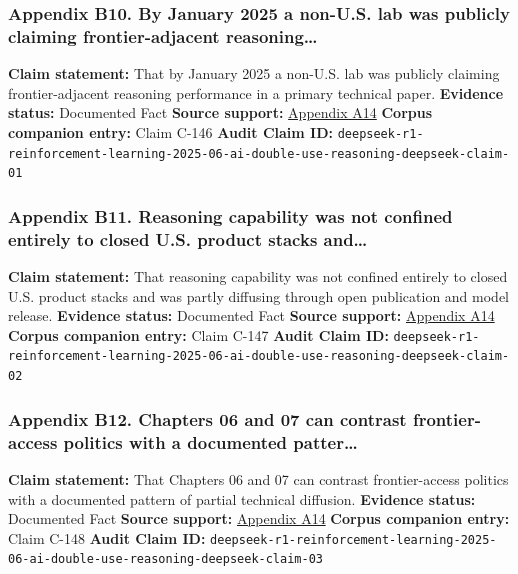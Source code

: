 \documentclass[
  american,
  11pt,
  letterpaper,
]{article}
\begin{document}
\subsubsection{Appendix B10. By January 2025 a non-U.S. lab was publicly
claiming frontier-adjacent
reasoning\ldots{}}\label{ch-06-appendix-b10-by-january-2025-a-non-u-s-lab-was-publicly-claiming-frontier-adjacent-reasoning}

\textbf{Claim statement:} That by January 2025 a non-U.S. lab was
publicly claiming frontier-adjacent reasoning performance in a primary
technical paper. \textbf{Evidence status:} Documented Fact
\textbf{Source support:}
\hyperref[ch-06-appendix-a14-deepseek-r1-incentivizing-reasoning-capability-in-llms-via-reinforcement-learning]{Appendix
A14} \textbf{Corpus companion entry:} Claim C-146 \textbf{Audit Claim
ID:}
\texttt{deepseek-r1-reinforcement-learning-2025-06-ai-double-use-reasoning-deepseek-claim-01}

\subsubsection{Appendix B11. Reasoning capability was not confined
entirely to closed U.S. product stacks
and\ldots{}}\label{ch-06-appendix-b11-reasoning-capability-was-not-confined-entirely-to-closed-u-s-product-stacks-and}

\textbf{Claim statement:} That reasoning capability was not confined
entirely to closed U.S. product stacks and was partly diffusing through
open publication and model release. \textbf{Evidence status:} Documented
Fact \textbf{Source support:}
\hyperref[ch-06-appendix-a14-deepseek-r1-incentivizing-reasoning-capability-in-llms-via-reinforcement-learning]{Appendix
A14} \textbf{Corpus companion entry:} Claim C-147 \textbf{Audit Claim
ID:}
\texttt{deepseek-r1-reinforcement-learning-2025-06-ai-double-use-reasoning-deepseek-claim-02}

\subsubsection{Appendix B12. Chapters 06 and 07 can contrast
frontier-access politics with a documented
patter\ldots{}}\label{ch-06-appendix-b12-chapters-06-and-07-can-contrast-frontier-access-politics-with-a-documented-patter}

\textbf{Claim statement:} That Chapters 06 and 07 can contrast
frontier-access politics with a documented pattern of partial technical
diffusion. \textbf{Evidence status:} Documented Fact \textbf{Source
support:}
\hyperref[ch-06-appendix-a14-deepseek-r1-incentivizing-reasoning-capability-in-llms-via-reinforcement-learning]{Appendix
A14} \textbf{Corpus companion entry:} Claim C-148 \textbf{Audit Claim
ID:}
\texttt{deepseek-r1-reinforcement-learning-2025-06-ai-double-use-reasoning-deepseek-claim-03}
\end{document}
